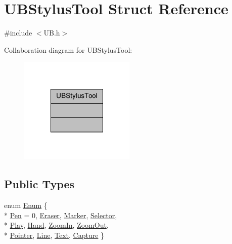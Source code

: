 \hypertarget{struct_u_b_stylus_tool}{\section{U\-B\-Stylus\-Tool Struct Reference}
\label{d4/dd7/struct_u_b_stylus_tool}
}


{\ttfamily \#include $<$U\-B.\-h$>$}



Collaboration diagram for U\-B\-Stylus\-Tool\-:
\nopagebreak
\begin{figure}[H]
\begin{center}
\leavevmode
\includegraphics[width=156pt]{d6/d44/struct_u_b_stylus_tool__coll__graph}
\end{center}
\end{figure}
\subsection*{Public Types}
\begin{DoxyCompactItemize}
\item 
enum \hyperlink{struct_u_b_stylus_tool_acc3e432aa8846d2ec16c6c2d914ce9e9}{Enum} \{ \\*
\hyperlink{struct_u_b_stylus_tool_acc3e432aa8846d2ec16c6c2d914ce9e9acc1f592df46406c5346321d1cc9ec676}{Pen} =  0, 
\hyperlink{struct_u_b_stylus_tool_acc3e432aa8846d2ec16c6c2d914ce9e9a4030bd2acedb024b3eec1173e2ebc705}{Eraser}, 
\hyperlink{struct_u_b_stylus_tool_acc3e432aa8846d2ec16c6c2d914ce9e9ae35495827e689e89f0d8710b1863fe0d}{Marker}, 
\hyperlink{struct_u_b_stylus_tool_acc3e432aa8846d2ec16c6c2d914ce9e9a68529751c1aec797cb07039723dc59b8}{Selector}, 
\\*
\hyperlink{struct_u_b_stylus_tool_acc3e432aa8846d2ec16c6c2d914ce9e9a552fd0b0ae42fc66b4f526ad1558952c}{Play}, 
\hyperlink{struct_u_b_stylus_tool_acc3e432aa8846d2ec16c6c2d914ce9e9a9e68ade00ac59560335c1e4c2b70747a}{Hand}, 
\hyperlink{struct_u_b_stylus_tool_acc3e432aa8846d2ec16c6c2d914ce9e9a1b1628b54292ecf76005e74cdadde67b}{Zoom\-In}, 
\hyperlink{struct_u_b_stylus_tool_acc3e432aa8846d2ec16c6c2d914ce9e9a98abcea5dce959c6d62fdfb9eae0d1d3}{Zoom\-Out}, 
\\*
\hyperlink{struct_u_b_stylus_tool_acc3e432aa8846d2ec16c6c2d914ce9e9a985a1fbae887d0fa9227fef4c6f12b04}{Pointer}, 
\hyperlink{struct_u_b_stylus_tool_acc3e432aa8846d2ec16c6c2d914ce9e9ae4f35ceec94248c1e0b5ad2fc830c68b}{Line}, 
\hyperlink{struct_u_b_stylus_tool_acc3e432aa8846d2ec16c6c2d914ce9e9a348c5633b77064276b97e340aee4357e}{Text}, 
\hyperlink{struct_u_b_stylus_tool_acc3e432aa8846d2ec16c6c2d914ce9e9a585c78bf85d6c66b5c16ca36f29b7c7f}{Capture}
 \}
\end{DoxyCompactItemize}


